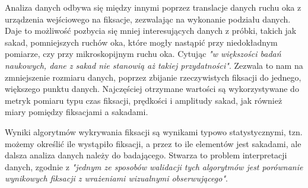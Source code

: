 Analiza danych odbywa się między innymi poprzez translacje danych ruchu oka z urządzenia wejściowego na fiksacje, zezwalając na wykonanie podziału danych. Daje to możliwość pozbycia się mniej interesujących danych z próbki, takich jak sakad, pomniejszych ruchów oka, które mogły nastąpić przy niedokładnym pomiarze, czy przy mikroskopijnym ruchu oka. Cytując \cite{Main} \emph{"w większości badań naukowych, dane z sakad nie stanowią aż takiej przydatności"}. Zezwala to nam na zmniejszenie rozmiaru danych, poprzez zbijanie rzeczywistych fiksacji do jednego, większego punktu danych. Najczęściej otrzymane wartości są wykorzystywane do metryk pomiaru typu czas fiksacji, prędkości i amplitudy sakad, jak również miary pomiędzy fiksacjami a sakadami.\par
Wyniki algorytmów wykrywania fiksacji są wynikami typowo statystycznymi, tzn. możemy określić ile wystąpiło fiksacji, a przez to ile elementów jest sakadami, ale dalsza analiza danych należy do badającego. Stwarza to problem interpretacji danych, zgodnie z \cite{Main} \emph{"jednym ze sposobów walidacji tych algorytmów jest porównanie wynikowych fiksacji z wrażeniami wizualnymi obserwującego"}.
